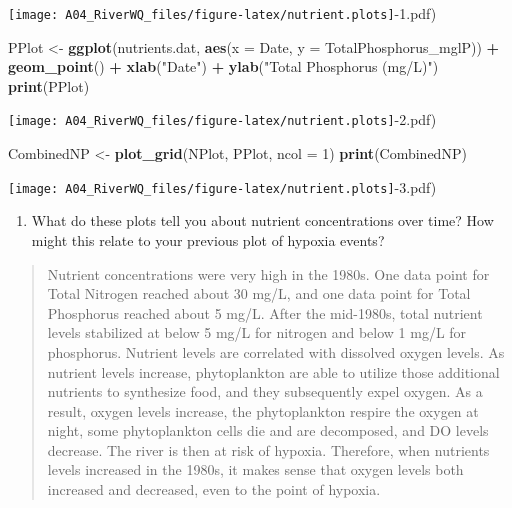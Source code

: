 \documentclass[]{article}
\newenvironment{Shaded}{\begin{snugshade}}{\end{snugshade}}
\newcommand{\DataTypeTok}[1]{\textcolor[rgb]{0.13,0.29,0.53}{#1}}
\newcommand{\DecValTok}[1]{\textcolor[rgb]{0.00,0.00,0.81}{#1}}
\newcommand{\KeywordTok}[1]{\textcolor[rgb]{0.13,0.29,0.53}{\textbf{#1}}}
\newcommand{\NormalTok}[1]{#1}
\newcommand{\OperatorTok}[1]{\textcolor[rgb]{0.81,0.36,0.00}{\textbf{#1}}}
\newcommand{\StringTok}[1]{\textcolor[rgb]{0.31,0.60,0.02}{#1}}
\providecommand{\tightlist}{%
  \setlength{\itemsep}{0pt}\setlength{\parskip}{0pt}}
\begin{document}
\texttt{[image: A04\_RiverWQ\_files/figure-latex/nutrient.plots]}-1.pdf)

\begin{Shaded}
\begin{Highlighting}[]
\NormalTok{PPlot <-}
\StringTok{  }\KeywordTok{ggplot}\NormalTok{(nutrients.dat, }\KeywordTok{aes}\NormalTok{(}\DataTypeTok{x =}\NormalTok{ Date, }\DataTypeTok{y =}\NormalTok{ TotalPhosphorus_mglP)) }\OperatorTok{+}
\StringTok{  }\KeywordTok{geom_point}\NormalTok{() }\OperatorTok{+}
\StringTok{  }\KeywordTok{xlab}\NormalTok{(}\StringTok{"Date"}\NormalTok{) }\OperatorTok{+}
\StringTok{  }\KeywordTok{ylab}\NormalTok{(}\StringTok{"Total Phosphorus (mg/L)"}\NormalTok{)}
\KeywordTok{print}\NormalTok{(PPlot)}
\end{Highlighting}
\end{Shaded}

\texttt{[image: A04\_RiverWQ\_files/figure-latex/nutrient.plots]}-2.pdf)

\begin{Shaded}
\begin{Highlighting}[]
\NormalTok{CombinedNP <-}
\StringTok{  }\KeywordTok{plot_grid}\NormalTok{(NPlot, PPlot, }\DataTypeTok{ncol =} \DecValTok{1}\NormalTok{)}
\KeywordTok{print}\NormalTok{(CombinedNP)}
\end{Highlighting}
\end{Shaded}

\texttt{[image: A04\_RiverWQ\_files/figure-latex/nutrient.plots]}-3.pdf)

\begin{enumerate}
\def\labelenumi{\arabic{enumi}.}
\setcounter{enumi}{8}
\tightlist
\item
  What do these plots tell you about nutrient concentrations over time?
  How might this relate to your previous plot of hypoxia events?
\end{enumerate}

\begin{quote}
Nutrient concentrations were very high in the 1980s. One data point for
Total Nitrogen reached about 30 mg/L, and one data point for Total
Phosphorus reached about 5 mg/L. After the mid-1980s, total nutrient
levels stabilized at below 5 mg/L for nitrogen and below 1 mg/L for
phosphorus. Nutrient levels are correlated with dissolved oxygen levels.
As nutrient levels increase, phytoplankton are able to utilize those
additional nutrients to synthesize food, and they subsequently expel
oxygen. As a result, oxygen levels increase, the phytoplankton respire
the oxygen at night, some phytoplankton cells die and are decomposed,
and DO levels decrease. The river is then at risk of hypoxia. Therefore,
when nutrients levels increased in the 1980s, it makes sense that oxygen
levels both increased and decreased, even to the point of hypoxia.
\end{quote}
\end{document}
